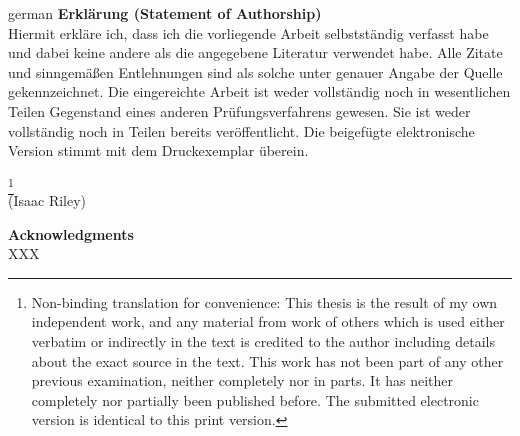  \newpage
  \thispagestyle{empty}
  \begin{otherlanguage}
  {german}
  \noindent\textbf{Erklärung (Statement of Authorship)}\\
  
  
  \noindent Hiermit erkläre ich, dass ich die vorliegende Arbeit selbstständig verfasst habe und dabei keine andere als die angegebene Literatur verwendet habe. Alle Zitate und sinngemäßen Entlehnungen sind als solche unter genauer Angabe der Quelle gekennzeichnet. Die eingereichte Arbeit ist weder vollständig noch in wesentlichen Teilen Gegenstand eines anderen Prüfungsverfahrens gewesen. Sie ist weder vollständig noch in Teilen bereits veröffentlicht. Die beigefügte elektronische Version stimmt mit dem Druckexemplar überein.%
  \end{otherlanguage}
  \footnote{Non-binding translation for convenience: This thesis is the result of my own independent work, and any material from work of others which is used either verbatim or indirectly in the text is credited to the author including details about the exact source in the text. This work has not been part of any other previous examination, neither completely nor in parts. It has neither completely nor partially been published before. The submitted electronic version is identical to this print version.}\\[2cm]
  \vspace{2cm}
  (Isaac Riley)
  
  \newpage
  \thispagestyle{empty}
  \noindent \textbf{Acknowledgments}\\
  \noindent XXX
  
  
  \newpage
  \tableofcontents
  \newpage